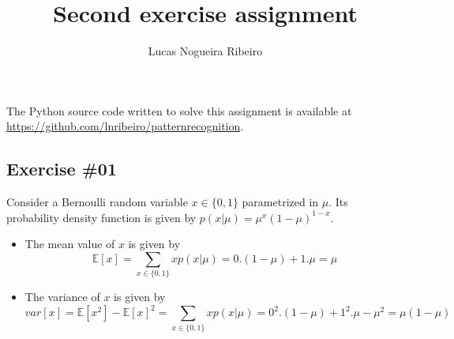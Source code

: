 \documentclass[a4paper,12pt]{article}
\title{Second exercise assignment}
\author{Lucas Nogueira Ribeiro}
\date{}
\begin{document}
\maketitle

The Python source code written to solve this assignment is available at \url{https://github.com/lnribeiro/patternrecognition}.

\subsection*{Exercise \#01}
Consider a Bernoulli random variable $x \in \{0,1\}$ parametrized in $\mu$. Its probability density function is given by $p(x|\mu) = \mu^x(1-\mu)^{1-x}$.
\begin{itemize}
  \item The mean value of $x$ is given by \[\mathbb{E}[x] = \sum_{x\in\{0,1\}} xp(x|\mu) = 0.(1-\mu) + 1.\mu = \mu\]
  \item The variance of $x$ is given by \[var[x] = \mathbb{E}[x^2] - \mathbb{E}[x]^2 = \sum_{x\in\{0,1\}} xp(x|\mu) = 0^2.(1-\mu) + 1^2.\mu - \mu^2 = \mu(1-\mu)\]
\end{itemize}
\end{document}

